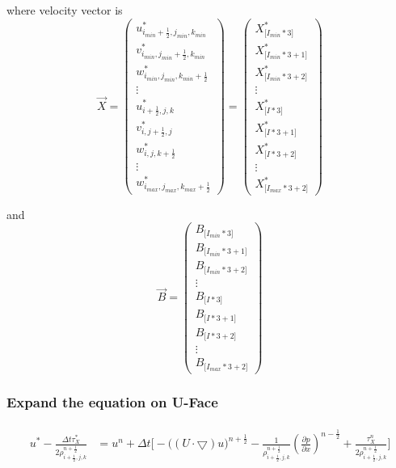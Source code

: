 \documentclass{article}
\numberwithin{equation}{subsection}
\begin{document}
where velocity vector is
\begin{equation}
\vec{X} =
\begin{pmatrix}
u^*_{i_{min}+\frac{1}{2},j_{min},k_{min}}\\ v^*_{i_{min},j_{min}+\frac{1}{2},k_{min}}\\ w^*_{i_{min},j_{min},k_{min}+\frac{1}{2}} \\\vdots \\ u^*_{i+\frac{1}{2},j,k} \\ v^*_{i,j+\frac{1}{2},j} \\w^*_{i,j,k+\frac{1}{2}}  \\\vdots \\ w^*_{i_{max},j_{max},k_{max}+\frac{1}{2}}
\end{pmatrix}
=
\begin{pmatrix}
X^*_{\Big[I_{min}*3\Big]}\\ X^*_{\Big[I_{min}*3+1\Big]}\\ X^*_{\Big[I_{min}*3+2\Big]} \\\vdots \\ X^*_{\Big[I*3\Big]} \\ X^*_{\Big[I*3+1\Big]} \\ X^*_{\Big[I*3+2\Big]}  \\\vdots \\ X^*_{\Big[I_{max}*3+2\Big]}
\end{pmatrix}
\end{equation}


and 
\begin{equation}
\vec{B}=
\begin{pmatrix}
B_{\Big[I_{min}*3\Big]}\\ B_{\Big[I_{min}*3+1\Big]}\\ B_{\Big[I_{min}*3+2\Big]} \\\vdots \\ B_{\Big[I*3\Big]} \\ B_{\Big[I*3+1\Big]} \\ B_{\Big[I*3+2\Big]}  \\\vdots \\ B_{\Big[I_{max}*3+2\Big]}
\end{pmatrix}
\end{equation}




\subsubsection{Expand the equation on U-Face}
\begin{align}
\begin{split}
u^{*} - \frac{\Delta t  \tau_X^{*}}{2\rho^{n+\frac{1}{2}}_{i+\frac{1}{2},j,k}} &= u^n + \Delta t \Bigg[ -\Big( (U \cdot \bigtriangledown) u\Big)^{n+\frac{1}{2}}
-\frac{1}{\rho^{n+\frac{1}{2}}_{i+\frac{1}{2},j,k}}  (\frac{\partial p}{\partial x})^{n-\frac{1}{2}} + \frac{ \tau_X^{n}}{2\rho^{n+\frac{1}{2}}_{i+\frac{1}{2},j,k}} \Bigg]
\end{split}
\end{align}
\end{document}
